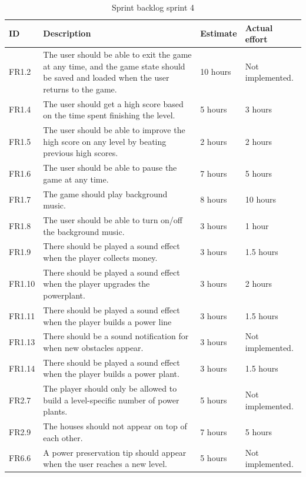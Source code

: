 	\begin{table} [H]
	\begin{tabular}{| p{1cm} | p{7cm} | p{2cm} | p{2cm} |}
		\hline
		\rowcolor{gray}
		ID & Description & Estimate & Actual effort \\ \hline
		FR1.2 &  The user should be able to exit the game at any time, and the game state should be saved and loaded when the user returns to the game. 
		& 10 hours & Not implemented. \\ \hline

		FR1.4 & The user should get a high score based on the time spent finishing the level. 
		& 5 hours & 3 hours \\ \hline

		FR1.5 & The user should be able to improve the high score on any level by beating previous high scores. 
		& 2 hours & 2 hours  \\ \hline

		FR1.6 & The user should be able to pause the game at any time. 
		& 7 hours & 5 hours \\ \hline

		FR1.7 & The game should play background music. 
		& 8 hours & 10 hours \\ \hline

		FR1.8 & The user should be able to turn on/off the background music. 
		& 3 hours & 1 hour \\ \hline

		FR1.9 & There should be played a sound effect when the player collects money. 
		& 3 hours & 1.5 hours \\ \hline

		FR1.10 & There should be played a sound effect when the player upgrades the powerplant. 
		& 3 hours & 2 hours \\ \hline

		FR1.11 & There should be played a sound effect when the player builds a power line 
		& 3 hours & 1.5 hours \\ \hline

		FR1.13 & There should be a sound notification for when new obstacles appear. 
		& 3 hours & Not implemented. \\ \hline

		FR1.14 & There should be played a sound effect when the player builds a power plant. 
		& 3 hours & 1.5 hours \\ \hline

		FR2.7 & The player should only be allowed to build a level-specific number of power plants. 
		& 5 hours & Not implemented.  \\ \hline

		FR2.9 & The houses should not appear on top of each other. 
		& 7 hours & 5 hours \\ \hline
		
		FR6.6 & A power preservation tip should appear when the user reaches a new level. 
		& 5 hours & Not implemented. \\ \hline

	\end{tabular}
	\caption{Sprint backlog sprint 4}
	\end{table}

